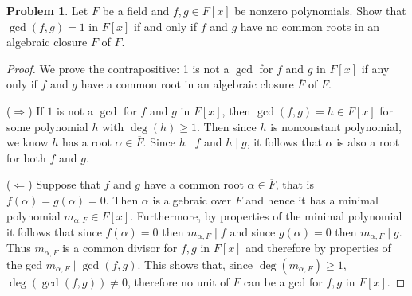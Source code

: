 \documentclass[11pt]{article}
\newcommand{\ov}[1]{\overline{#1}}
\def\ov#1{\overline{#1}}
\theoremstyle{definition}
\newtheorem{problem}{Problem}
\begin{document}
\begin{problem}
Let $F$ be a field and $f,g \in F[x]$ be nonzero polynomials. Show that $\gcd(f,g) = 1$ in $F[x]$ if and only if $f$ and $g$ have no common roots in an algebraic closure $\overline{F}$ of $F$.
\end{problem}

\begin{proof}
We prove the contrapositive: 1 is  not a $\gcd$ for $f$ and $g$ in $F[x]$ if any only if $f$ and $g$ have a common root in an algebraic closure $\ov{F}$ of $F$.

($\Rightarrow$) If $1$ is not a $\gcd$ for $f$ and $g$ in $F[x]$, then $\gcd(f,g)=h\in F[x]$ for some polynomial $h$ with $\deg(h) \geqslant 1$. 
Then since $h$ is nonconstant polynomial, we know $h$ has a root $\alpha\in \ov{F}$. Since $h\mid f$ and $h\mid g$, it follows that $\alpha$ is also a root for both $f$ and $g$.

($\Leftarrow$) Suppose that $f$ and $g$ have a common root $\alpha \in \overline{F}$, that is $f(\alpha)=g(\alpha)=0$. Then $\alpha$ is algebraic over $F$ and hence it has a minimal polynomial $m_{\alpha,F}\in F[x]$. Furthermore, by properties of the minimal polynomial it follows that since $f(\alpha)=0$ then $m_{\alpha,F}\mid f$ and since $g(\alpha)=0$ then $m_{\alpha,F}\mid g$. Thus $m_{\alpha,F}$ is a common divisor for $f,g$ in $F[x]$ and therefore by properties of the gcd $m_{\alpha,F}\mid\gcd(f,g)$. This shows that, since $\deg(m_{\alpha,F})\geqslant 1$, $\deg(\gcd(f,g))\neq 0$, therefore no unit of $F$ can be a gcd for $f,g$ in $F[x]$.
\end{proof}
\end{document}
